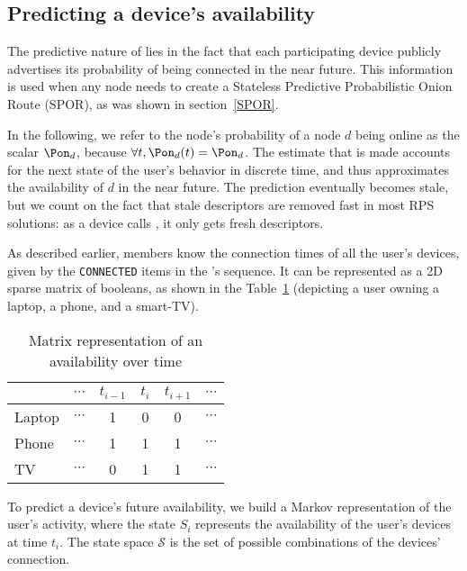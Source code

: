 \subsection{Predicting a device's availability}
\label{ssec:device_availability}

The predictive nature of \name lies in the fact that each participating device publicly advertises its probability of being connected in the near future. 
This information is used when any node needs to create a Stateless Predictive Probabilistic Onion Route (\acs{SPOR}), as was shown in section~\ref{SPOR}.

In the following, we refer to the node's probability of a node $d$ being online as the scalar $\Pon_d$, because $\forall t, \Pon_d(t) = \Pon_d$.
The estimate that is made accounts for the next state of the user's behavior in discrete time, and thus approximates the availability of $d$ in the near future.
The prediction eventually becomes stale, but we count on the fact that stale descriptors are removed fast in most RPS solutions: 
as a device calls \GetRandomNode, it only gets fresh descriptors.

As described earlier, \squad members know the connection times of all the user's devices, given by the \texttt{CONNECTED} items in the \squad's sequence.
It can be represented as a 2D sparse matrix of booleans, as shown in the Table~\ref{tab:connection_times} (depicting a user owning a laptop, a phone, and a smart-TV).


\begin{table}
\caption{Matrix representation of an \squad availability over time}
\centering
\begin{tabular}{@{}lccccc@{}} \toprule
		& $\cdots$	& $t_{i-1}$	& $t_i$		& $t_{i+1}$	& $\cdots$ \\ \midrule
Laptop	& $\cdots$	& 1			& 0			& 0			& $\cdots$ \\
Phone	& $\cdots$	& 1			& 1			& 1			& $\cdots$ \\
TV		& $\cdots$	& 0			& 1			& 1			& $\cdots$ \\ \bottomrule
\end{tabular}
\label{tab:connection_times}
\end{table}

To predict a device's future availability, we build a Markov representation of the user's activity, 
where the state $S_i$ represents the availability of the user's devices at time $t_i$.
The state space $\mathcal{S}$ is the set of possible combinations of the devices' connection.

